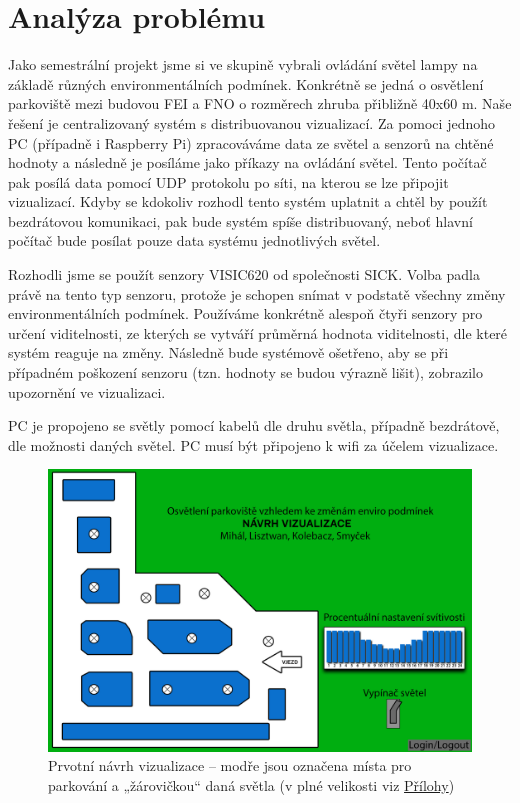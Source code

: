 \chapter{Analýza problému}

Jako semestrální projekt jsme si ve skupině vybrali ovládání světel lampy na základě různých environmentálních podmínek. Konkrétně se jedná o osvětlení parkoviště mezi budovou FEI a FNO o rozměrech zhruba přibližně 40x60 m. Naše řešení je centralizovaný systém s distribuovanou vizualizací. Za pomoci jednoho PC (případně i Raspberry Pi) zpracováváme data ze světel a senzorů na chtěné hodnoty a následně je posíláme jako příkazy na ovládání světel. Tento počítač pak posílá data pomocí UDP protokolu po síti, na kterou se lze připojit vizualizací. Kdyby se kdokoliv rozhodl tento systém uplatnit a chtěl by použít bezdrátovou komunikaci, pak bude systém spíše distribuovaný, neboť hlavní počítač bude posílat pouze data systému jednotlivých světel. 

Rozhodli jsme se použít senzory VISIC620 od společnosti SICK. Volba padla právě na tento typ senzoru, protože je schopen snímat v podstatě všechny změny environmentálních podmínek. Používáme konkrétně alespoň čtyři senzory pro určení viditelnosti, ze kterých se vytváří průměrná hodnota viditelnosti, dle které systém reaguje na změny. Následně bude systémově ošetřeno, aby se při případném poškození senzoru (tzn. hodnoty se budou výrazně lišit), zobrazilo upozornění ve vizualizaci.\parencite{senzor}

PC je propojeno se světly pomocí kabelů dle druhu světla, případně bezdrátově, dle možnosti daných světel. PC musí být připojeno k wifi za účelem vizualizace.



\begin{figure}[H]
    \centering\includegraphics[width=\textwidth]{Figures/Navrh-viz.png}   
    \caption{Prvotní návrh vizualizace -- modře jsou označena místa pro parkování a „žárovičkou“ daná světla (v plné velikosti viz \hyperref[Sec-Prilohy]{Přílohy})}
    \label{Obr-Navrh-viz}
\end{figure}


